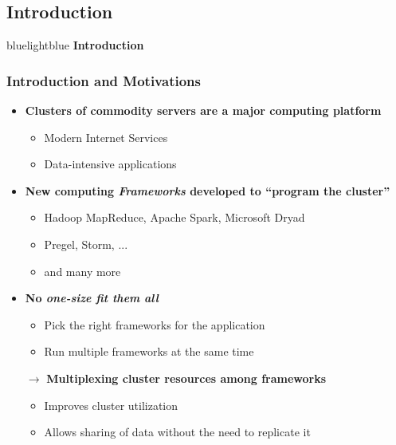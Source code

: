 \subsection{Introduction}
\begin{frame}
 \begin{colorblock}{blue}{lightblue}{ }
    \Large \textbf{Introduction}
  \end{colorblock}
\end{frame}

\begin{frame}
\frametitle{Introduction and Motivations}
\begin{itemize}
	\item {\bf Clusters of commodity servers are a major computing platform}
	\begin{itemize}
		\item Modern Internet Services
		\item Data-intensive applications
	\end{itemize}
	\item {\bf New computing {\it Frameworks} developed to ``program the cluster''}
	\begin{itemize}
		\item Hadoop MapReduce, Apache Spark, Microsoft Dryad
		\item Pregel, Storm, ...
		\item and many more
	\end{itemize}
	\item {\bf No {\it one-size fit them all}}
	\begin{itemize}
		\item Pick the right frameworks for the application
		\item Run multiple frameworks at the same time
	\end{itemize}
	\item[$\to$] {\bf Multiplexing cluster resources among frameworks}
	\begin{itemize}
		\item Improves cluster utilization
		\item Allows sharing of data without the need to replicate it
	\end{itemize}
\end{itemize}
\end{frame}

